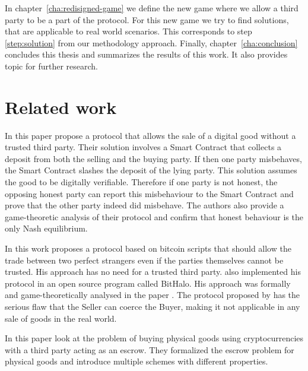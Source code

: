\documentclass{cacthesis}
\newcommand{\authnote}[3]{{ \footnotesize \textbf{#1[#2: #3]~}}}
\newcommand{\orfnote}[1]{\authnote{\color{blue}}{Orfeas}{#1}}
\begin{document}
	In chapter~\ref{cha:redisigned-game} we define the new game where we allow a third party to be a part of the protocol. For this new game we try to find solutions, that are applicable to real world scenarios. This corresponds to step \ref{step:solution} from our methodology approach. Finally, chapter~\ref{cha:conclusion} concludes this thesis and summarizes the results of this work. It also provides topic for further research.
\section{Related work}
In this paper \citeauthor{asgaonkar_solving_2019} propose a protocol that allows the sale of a digital good without a trusted third party. Their solution involves a Smart Contract that collects a deposit from both the selling and the buying party. If then one party misbehaves, the Smart Contract slashes the deposit of the lying party.  This solution assumes the good to be digitally verifiable. Therefore if one party is not honest, the opposing honest party can report this misbehaviour to the Smart Contract and prove that the other party indeed did misbehave. The authors also provide a game-theoretic analysis of their protocol and confirm that honest behaviour is the only Nash equilibrium.\newline

In this work \citeauthor{zimbeck_two_nodate} proposes a protocol based on bitcoin scripts that should allow the trade between two perfect strangers even if the parties themselves cannot be trusted. His approach has no need for a trusted third party. \citeauthor{zimbeck_two_nodate} also implemented his protocol in an open source program called BitHalo. His approach was formally and game-theoretically analysed in the paper \cite{bodei_validation_2015}. The protocol proposed by \citeauthor{zimbeck_two_nodate} has the serious flaw that the Seller can coerce the Buyer\cite{goharshady_irrationality_2021}, making it not applicable in any sale of goods in the real world.\newline

In this paper \citeauthor{kiayias_escrow_2017} look at the problem of buying physical goods using cryptocurrencies with a third party acting as an escrow. They formalized the escrow problem for physical goods and introduce multiple schemes with different properties. \newline %
\end{document}
